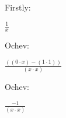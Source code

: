 \documentclass[12pt]{article}
\begin{document}
Firstly: 
\begin{center}
$ \frac{1}{x} $
\end{center}
Ochev: 
\begin{center}
$ \frac{((0 \cdot x) - (1 \cdot 1))}{(x \cdot x)} $
\end{center}
Ochev: 
\begin{center}
$ \frac{-1}{(x \cdot x)} $
\end{center}
\end{document}

